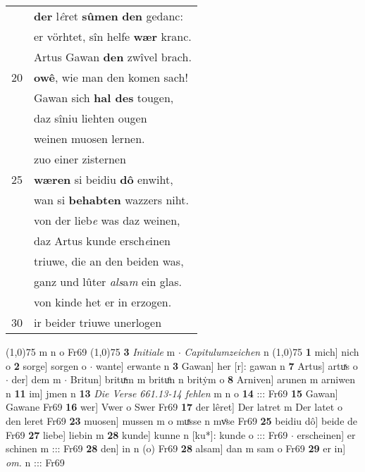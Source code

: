 \documentclass[8pt,a4paper,notitlepage]{article}
\begin{document}
\begin{table}[ht]
\begin{minipage}[t]{0.5\linewidth}
\begin{tabular}{rl}
 & \textbf{der} l\textit{ê}ret \textbf{sûmen} \textbf{den} gedanc:\\ 
 & er vörhtet, sîn helfe \textbf{wær} kranc.\\ 
 & Artus Gawan \textbf{den} zwîvel brach.\\ 
20 & \textbf{owê}, wie man den komen sach!\\ 
 & Gawan sich \textbf{hal des} tougen,\\ 
 & daz sîniu liehten ougen\\ 
 & weinen muosen lernen.\\ 
 & zuo einer zisternen\\ 
25 & \textbf{wæren} si beidiu \textbf{dô} enwiht,\\ 
 & wan si \textbf{behabten} wazzers niht.\\ 
 & von der lieb\textit{e} was daz weinen,\\ 
 & daz Artus kunde ersch\textit{e}inen\\ 
 & triuwe, die an den beiden was,\\ 
 & ganz und lûter \textit{als}a\textit{m} ein glas.\\ 
 & von kinde het er in erzogen.\\ 
30 & ir beider triuwe unerlogen\\ 
\end{tabular}
\scriptsize
\line(1,0){75} \newline
m n o Fr69 \newline
\line(1,0){75} \newline
\textbf{3} \textit{Initiale} m   $\cdot$ \textit{Capitulumzeichen} n  \newline
\line(1,0){75} \newline
\textbf{1} mich] nich o \textbf{2} sorge] sorgen o  $\cdot$ wante] erwante n \textbf{3} Gawan] her [r]: gawan n \textbf{7} Artus] artuͯs o  $\cdot$ der] dem m  $\cdot$ Britun] brituͯm m brituͦn n britẏm o \textbf{8} Arniven] arunen m arniwen n \textbf{11} im] jmen n \textbf{13} \textit{Die Verse 661.13-14 fehlen} m n o  \textbf{14} ::: Fr69 \textbf{15} Gawan] Gawane Fr69 \textbf{16} wer] Vwer o Swer Fr69 \textbf{17} der lêret] Der latret m Der latet o den leret Fr69 \textbf{23} muosen] mussen m o muͯsse n mvͦse Fr69 \textbf{25} beidiu dô] beide de Fr69 \textbf{27} liebe] liebin m \textbf{28} kunde] kunne n [ku*]: kunde o ::: Fr69  $\cdot$ erscheinen] er schinen m ::: Fr69 \textbf{28} den] in n (o) Fr69 \textbf{28} alsam] dan m sam o Fr69 \textbf{29} er in] \textit{om.} n ::: Fr69 \newline
\end{minipage}
\end{table}
\end{document}
